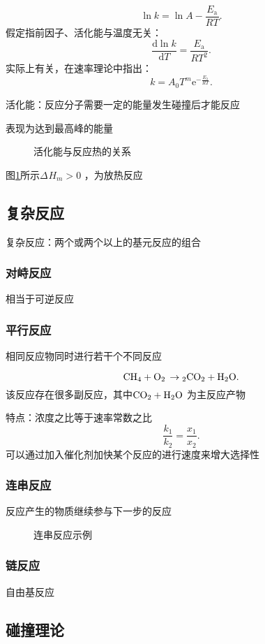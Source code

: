 \[
    \ln k = \ln A - \frac{E_\text{a}}{RT}
.\]
假定指前因子、活化能与温度无关：
\[
    \frac{\mathrm{d}\ln k}{\mathrm{d}T} = \frac{E_\text{a}}{RT^2 }
.\]
实际上有关，在速率理论中指出：\[
    k = A_0T^{m}\mathrm{e}^{-\frac{E_\text{a}}{RT}}
.\]
\begin{notation}
    活化能：反应分子需要一定的能量发生碰撞后才能反应

    表现为达到最高峰的能量
\begin{figure}[ht!]
    \centering
    \caption{活化能与反应热的关系}
    \label{fig:活化能与反应热的关系}
\end{figure}

图\ref{fig:活化能与反应热的关系}所示$\Delta_\text{}H_{m}>0 $ ，为放热反应
\end{notation}
\subsection{复杂反应}%
\label{sub:复杂反应}
\begin{defi}
    复杂反应：两个或两个以上的基元反应的组合
\end{defi}
\subsubsection{对峙反应}%
\label{ssub*:对峙反应}
相当于可逆反应
\subsubsection{平行反应}%
\label{ssub*:平行反应}
相同反应物同时进行若干个不同反应
\begin{eg}
    \[
        \ce{CH_4 + O_2 \to 2CO_2 + H_2O}
    .\]
    该反应存在很多副反应，其中$\ce{CO_2 + H_2O}$ 为主反应产物
\end{eg}
特点：浓度之比等于速率常数之比\[
    \frac{k_1}{k_2} = \frac{x_1}{x_2}
.\]
可以通过加入催化剂加快某个反应的进行速度来增大选择性
\subsubsection{连串反应}%
\label{ssub*:连串反应}
反应产生的物质继续参与下一步的反应
\begin{eg}
\begin{figure}[ht!]
    \centering
    \caption{连串反应示例}
    \label{fig:连串反应示例}
\end{figure}
\end{eg}
\subsubsection{链反应}%
\label{ssub*:链反应}
\begin{eg}
    自由基反应
\end{eg}
\subsection{碰撞理论}%
\label{sub:碰撞理论}

